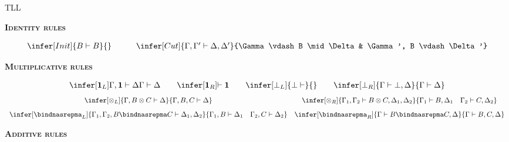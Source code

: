 \begin{entry}{TLL} 
\newcommand{\one}{\mathbf{1}}
\newcommand{\zero}{\mathbf{0}}
\newcommand\bang{\mathop{!}}
\newcommand\quest{\mathord{?}}
\newcommand\limp{\mathbin{-\hspace{-0.70mm}\circ}}
\newcommand\tensor\otimes




\begin{calculus}
\small
\begin{center}
 \textsc{\bf Identity rules}
\end{center}
\vspace{-5px}
\[
\begin{array}{ccc}
\infer[Init]{B \vdash B}{}
&
\quad
&
\infer[Cut]{\Gamma, \Gamma' \vdash \Delta,\Delta'}{\Gamma \vdash B \mid \Delta & \Gamma', B \vdash \Delta'}
\end{array}
\]
\begin{center}
 \textsc{\bf Multiplicative rules}
\end{center}
\vspace{-7px}
\[
\begin{array}{cccc}
\infer[\one_L]{\Gamma,\one \vdash\Delta}{\Gamma \vdash \Delta}\quad
&
\infer[\one_R]{ \vdash \one}{}\quad
&
\infer[\bot_L]{\bot\vdash}{}\quad
&
\infer[\bot_R]{\Gamma\vdash\bot, \Delta}{\Gamma \vdash  \Delta}
\end{array}
\]
\[
\begin{array}{cc}
\infer[\otimes_L]{\Gamma,B\otimes C\vdash \Delta}{\Gamma,B,C\vdash \Delta}
& 
\infer[\otimes_R]{\Gamma_1,\Gamma_2 \vdash B\otimes C, \Delta_1,\Delta_2}{\Gamma_1 \vdash B,\Delta_1\quad\Gamma_2 \vdash C,\Delta_2}
\\[8pt]
  \infer[\bindnasrepma_L]{\Gamma_1,\Gamma_2,B\bindnasrepma C \vdash \Delta_1,\Delta_2}{\Gamma_1,B\vdash \Delta_1 \quad \Gamma_2,C\vdash \Delta_2}
  &
  \infer[\bindnasrepma_R]{\Gamma \vdash B \bindnasrepma C, \Delta}{\Gamma \vdash B,C,\Delta}
\end{array}
\]
\begin{center}
 \textsc{\bf Additive rules}
\end{center}
\vspace{-7px}
\[
\begin{array}{cc}

\end{array}\]
\end{calculus}
\end{entry}

